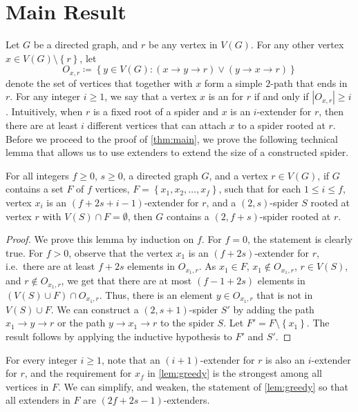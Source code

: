 \documentclass[a4paper,USenglish,cleveref,autoref,thm-restate,pdfa]{lipics-v2021}
\let\le\leqslant
\let\ge\geqslant
\newcommand{\set}[1]{{\left\{#1\right\}}}
\newcommand{\norm}[1]{{\left|#1\right|}}
\let\emph\relax\DeclareTextFontCommand{\emph}{\color{dark blue}\em}
\begin{document}
\section{Main Result}
Let $G$ be a directed graph, and $r$ be any vertex in $V(G)$.
For any other vertex $x \in V(G)\setminus\set{r}$, let 
\[
    O_{x,r} \coloneqq \set{ y \in V(G) : (x \to y \to r) \lor (y \to x \to r)}
\]
denote the set of vertices that together with $x$ form a simple $2$-path that ends in $r$.
For any integer $i \ge 1$, we say that a vertex $x$ is an \emph{$i$-extender} for $r$ if and only if $\norm{O_{x,r}} \ge i$.
Intuitively, when $r$ is a fixed root of a spider and $x$ is an $i$-extender for $r$, then there are at least $i$ different vertices that can attach $x$ to a spider rooted at $r$.
Before we proceed to the proof of \cref{thm:main}, we prove the following technical lemma that allows us to use extenders to extend the size of a constructed spider.
\begin{lemma}\label{lem:greedy}
    For all integers $f \ge 0$, $s \ge 0$, a directed graph $G$, and a vertex $r \in V(G)$, if $G$ contains a set $F$ of $f$ vertices, $F = \set{x_1,x_2,\ldots,x_f}$, such that for each $1\le i \le f$, vertex $x_i$ is an $(f+2s+i-1)$-extender for $r$, and a $(2,s)$\nobreakdash-spider $S$ rooted at vertex $r$ with $V(S) \cap F = \emptyset$, then $G$ contains a $(2,f+s)$\nobreakdash-spider rooted at $r$.
\end{lemma}
\begin{proof}
    We prove this lemma by induction on $f$.
    For $f=0$, the statement is clearly true.
    For $f>0$, observe that the vertex $x_1$ is an $(f+2s)$-extender for $r$, i.e.\ there are at least $f+2s$ elements in $O_{x_1,r}$.
    As $x_1 \in F$, $x_1 \notin O_{x_1,r}$, $r \in V(S)$, and $r \notin O_{x_1,r}$, we get that there are at most $(f-1 + 2s)$ elements in $(V(S)\cup F)\cap O_{x_1,r}$.
    Thus, there is an element $y \in O_{x_1,r}$ that is not in $V(S) \cup F$.
    We can construct a $(2,s+1)$\nobreakdash-spider $S'$ by adding the path $x_1 \to y \to r$ or the path $y \to x_1 \to r$ to the spider $S$.
    Let $F'=F\setminus \set{x_1}$.
    The result follows by applying the inductive hypothesis to $F'$ and $S'$.
\end{proof}
For every integer $i \ge 1$, note that an $(i+1)$-extender for $r$ is also an $i$-extender for $r$, and the requirement for $x_f$ in \cref{lem:greedy} is the strongest among all vertices in $F$. We can simplify, and weaken, the statement of \cref{lem:greedy} so that all extenders in $F$ are $(2f+2s-1)$-extenders.
\end{document}
